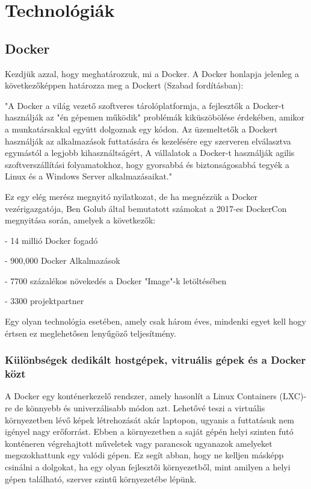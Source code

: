 \chapter{Technológiák}
\label{chapTech}

\section{Docker}

Kezdjük azzal, hogy meghatározzuk, mi a Docker.
A Docker honlapja jelenleg a következőképpen határozza meg a Dockert (Szabad fordításban):

"A Docker a világ vezető szoftveres tárolóplatformja, a fejlesztők a Docker-t használják az "én gépemen működik" problémák kiküszöbölése érdekében, amikor a munkatársakkal együtt dolgoznak egy kódon. Az üzemeltetők a Dockert használják az alkalmazások futtatására és kezelésére egy szerveren elválasztva egymástól a legjobb kihasználtságért, A vállalatok a Docker-t használják agilis szoftverszállítási folyamatokhoz, hogy gyorsabbá és biztonságosabbá tegyék a Linux és a Windows Server alkalmazásaikat." \cite{dockerswebpage}

Ez egy elég merész megnyitó nyilatkozat, de ha megnézzük a Docker vezérigazgatója, Ben Golub által bemutatott számokat a 2017-es DockerCon megnyitása során, amelyek a következők:

 - 14 millió Docker fogadó
 
 - 900,000 Docker Alkalmazások
 
 - 7700 százalékos növekedés a Docker "Image"-k letöltésében
 
 - 3300 projektpartner

Egy olyan technológia esetében, amely csak három éves, mindenki egyet kell hogy értsen ez meglehetősen lenyűgöző teljesítmény.  \cite{dockercondata2017}

\subsection{Különbségek dedikált hostgépek, vitruális gépek és a Docker közt}
A Docker egy konténerkezelő rendszer, amely hasonlít a Linux Containers (LXC)-re de könnyebb és univerzálisabb módon azt.
Lehetővé teszi a virtuális környezetben lévő képek létrehozását akár laptopon, ugyanis a futtatásuk nem igényel nagy erőforrást.
Ebben a környezetben a saját gépén helyi szinten futó konténeren végrehajtott műveletek vagy parancsok ugyanazok amelyeket megszokhattunk egy valódi gépen.
Ez segít abban, hogy ne kelljen másképp csinálni a dolgokat, ha egy olyan fejlesztői környezetből, mint amilyen a helyi gépen található, szerver szintű környezetébe lépünk.

